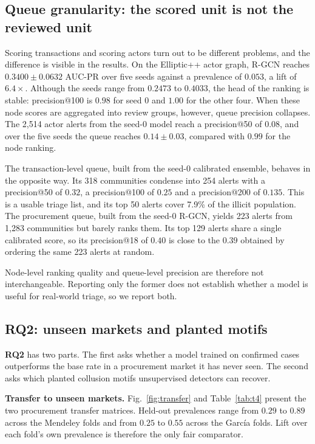 \documentclass[conference]{IEEEtran}
\newcommand{\RQ}[1]{\textbf{RQ#1}}
\begin{document}
\subsection{Queue granularity: the scored unit is not the reviewed unit}
\label{sec:granularity}

Scoring transactions and scoring actors turn out to be different problems, and
the difference is visible in the results. On the Elliptic++ actor graph, R-GCN
reaches $0.3400 \pm 0.0632$ AUC-PR over five seeds against a prevalence of
$0.053$, a lift of $6.4\times$. Although the seeds range from $0.2473$ to
$0.4033$, the head of the ranking is stable: precision@100 is $0.98$ for seed 0
and $1.00$ for the other four. When these node scores are aggregated into review
groups, however, queue precision collapses. The 2,514 actor alerts from the
seed-0 model reach a precision@50 of $0.08$, and over the five seeds the queue
reaches $0.14 \pm 0.03$, compared with $0.99$ for the node ranking.

The transaction-level queue, built from the seed-0 calibrated ensemble, behaves
in the opposite way. Its 318 communities condense into 254 alerts with a
precision@50 of $0.32$, a precision@100 of $0.25$ and a precision@200 of
$0.135$. This is a usable triage list, and its top 50 alerts cover 7.9\% of the
illicit population. The procurement queue, built from the seed-0 R-GCN, yields 223 alerts from
1,283 communities but barely ranks them. Its top 129 alerts share a single
calibrated score, so its precision@18 of $0.40$ is close to the $0.39$ obtained
by ordering the same 223 alerts at random.

Node-level ranking quality and queue-level precision are therefore not
interchangeable. Reporting only the former does not establish whether a model
is useful for real-world triage, so we report both.

\subsection{RQ2: unseen markets and planted motifs}
\label{sec:rq2}

\RQ{2} has two parts. The first asks whether a model trained on confirmed cases outperforms the base
rate in a procurement market it has never seen. The second asks which planted
collusion motifs unsupervised detectors can recover.

\textbf{Transfer to unseen markets.} Fig.~\ref{fig:transfer} and
Table~\ref{tab:t4} present the two procurement transfer matrices. Held-out
prevalences range from $0.29$ to $0.89$ across the Mendeley folds and from
$0.25$ to $0.55$ across the Garc\'ia folds. Lift over each fold's own
prevalence is therefore the only fair comparator.
\end{document}
